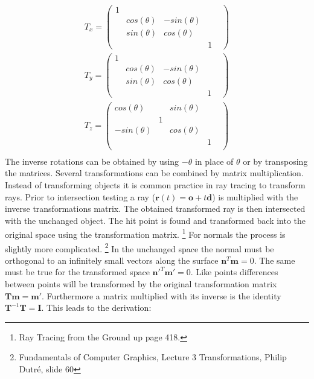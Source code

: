 \begin{align}
T_x = \begin{pmatrix}
	1&		&		&		&				\\
	&		cos(\theta)&	-sin(\theta)&	\\
    &		sin(\theta)&	cos(\theta)	&	\\
	&		&		&		1				
\end{pmatrix} \\
T_y = \begin{pmatrix}
	1&		&		&		&				\\
	&		cos(\theta)&	-sin(\theta)&	\\
    &		sin(\theta)&	cos(\theta)	&	\\
	&		&		&		1				
\end{pmatrix} \\
T_z = \begin{pmatrix}
cos(\theta) &	    &		sin(\theta) &	 &	\\
	         &	   1&	                &	 &	\\
-sin(\theta) &	    &		cos(\theta) &	& 	\\
		     &	    &		            &		1 \\
\end{pmatrix} \\
\end{align}
The inverse rotations can be obtained by using $-\theta$ in place of $\theta$ or by transposing the matrices. Several
transformations can be combined by matrix multiplication. \\
Instead of transforming objects it is common practice in ray tracing to transform rays. Prior to intersection testing
a ray ($\mathbf{r}(t) = \mathbf{o} + t\mathbf{d}$) is multiplied with the inverse transformations matrix. The obtained transformed ray is then intersected with the unchanged object. The hit point is found and transformed back into the
original space using the transformation matrix. \footnote{Ray Tracing from the Ground up page 418.} 
For normals the process is slightly more complicated. \footnote{ Fundamentals of
Computer Graphics, Lecture 3 Transformations, Philip Dutr\'e,  slide 60}
In the unchanged space the normal must be orthogonal to an infinitely small vectors along the surface $\mathbf{n}^T \mathbf{m} = 0$. The same must be true for the transformed space $\mathbf{n'}^T\mathbf{m'} = 0$. Like points differences between points will be transformed by the original transformation matrix $\mathbf{Tm} = \mathbf{m}'$. Furthermore a matrix multiplied with its inverse is the identity $\mathbf{T}^{-1}\mathbf{T} = \mathbf{I}$. This leads to the derivation:
